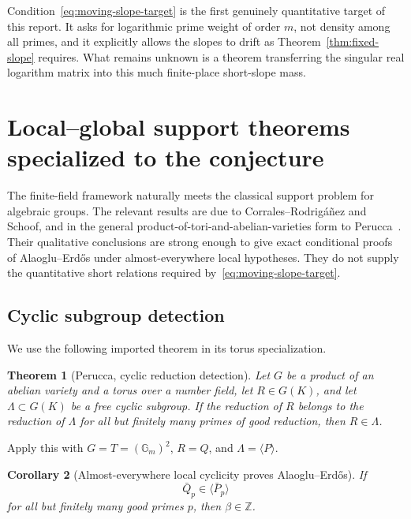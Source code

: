 \documentclass[11pt]{article}
\newtheorem{theorem}{Theorem}[section]
\newtheorem{corollary}[theorem]{Corollary}
\theoremstyle{definition}
\theoremstyle{remark}
\newcommand{\Z}{\mathbb Z}
\newcommand{\Gm}{\mathbb G_m}
\begin{document}
Condition~\eqref{eq:moving-slope-target} is the first genuinely quantitative target of this report.  It asks for logarithmic prime weight of order $m$, not density among all primes, and it explicitly allows the slopes to drift as Theorem~\ref{thm:fixed-slope} requires.  What remains unknown is a theorem transferring the singular real logarithm matrix into this much finite-place short-slope mass.

\section{Local--global support theorems specialized to the conjecture}
\label{sec:support}

The finite-field framework naturally meets the classical support problem for algebraic groups.  The relevant results are due to Corrales--Rodrig\'a\~nez and Schoof, and in the general product-of-tori-and-abelian-varieties form to Perucca~\cite{CorralesSchoof,PeruccaSupport,PeruccaDetect,PeruccaOrders}.  Their qualitative conclusions are strong enough to give exact conditional proofs of Alaoglu--Erd\H{o}s under almost-everywhere local hypotheses.  They do not supply the quantitative short relations required by~\eqref{eq:moving-slope-target}.

\subsection{Cyclic subgroup detection}

We use the following imported theorem in its torus specialization.

\begin{theorem}[Perucca, cyclic reduction detection]
\label{thm:perucca-cyclic}
Let $G$ be a product of an abelian variety and a torus over a number field, let $R\in G(K)$, and let $\Lambda\subset G(K)$ be a free cyclic subgroup.  If the reduction of $R$ belongs to the reduction of $\Lambda$ for all but finitely many primes of good reduction, then $R\in\Lambda$.
\end{theorem}

Apply this with $G=T=(\Gm)^2$, $R=Q$, and $\Lambda=\langle P\rangle$.

\begin{corollary}[Almost-everywhere local cyclicity proves Alaoglu--Erd\H{o}s]
\label{cor:local-cyclic-AE}
If
\[
 \bar Q_p\in\langle\bar P_p\rangle
\]
for all but finitely many good primes $p$, then $\beta\in\Z$.
\end{corollary}
\end{document}
